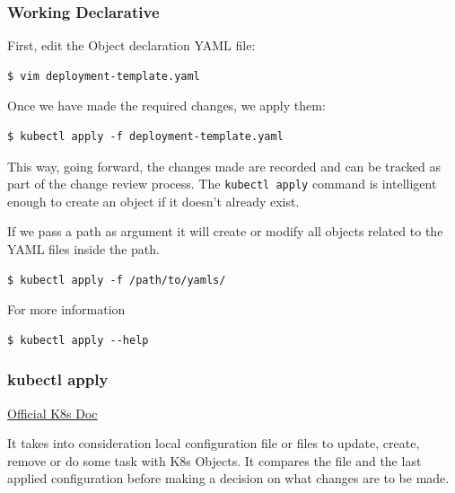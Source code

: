 \documentclass{article}
\newenvironment{codetemplate}[1][]{%
  \mybasecolorbox[#1]
  \itshape
}{%
  \endmybasecolorbox
}
\begin{document}
\subsubsection{Working Declarative}

First, edit the Object declaration YAML file:
\begin{codetemplate}{}
\begin{verbatim}
$ vim deployment-template.yaml
\end{verbatim}
\end{codetemplate}

Once we have made the required changes, we apply them:
\begin{codetemplate}{}
\begin{verbatim}
$ kubectl apply -f deployment-template.yaml
\end{verbatim}
\end{codetemplate}

This way, going forward, the changes made are recorded and can be tracked as part of the change review process. The \verb|kubectl apply| command is intelligent enough to create an object if it doesn't already exist.

If we pass a path as argument it will create or modify all objects related to the YAML files inside the path.

\begin{codetemplate}{}
\begin{verbatim}
$ kubectl apply -f /path/to/yamls/
\end{verbatim}
\end{codetemplate}

For more information
\begin{codetemplate}{}
\begin{verbatim}
$ kubectl apply --help
\end{verbatim}
\end{codetemplate}

\subsubsection{kubectl apply}

\href{https://jamesdefabia.github.io/docs/user-guide/kubectl/kubectl_apply/}{Official K8s Doc}

It takes into consideration local configuration file or files to update, create, remove or do some task with K8s Objects. It compares the file and the last applied configuration before making a decision on what changes are to be made.
\end{document}
